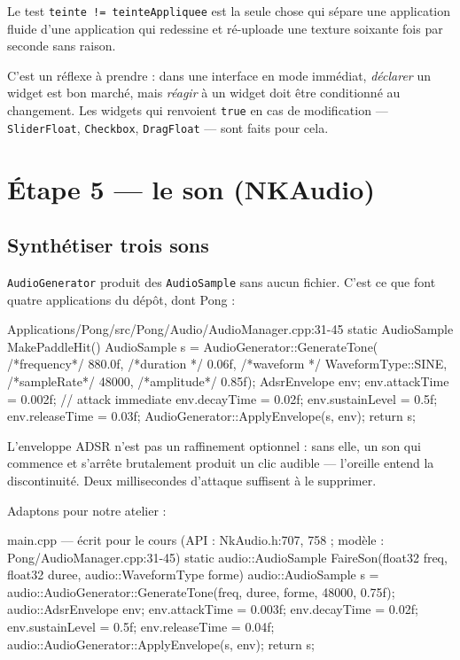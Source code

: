 \begin{nkretenir}
Le test \texttt{teinte != teinteAppliquee} est la seule chose qui sépare une
application fluide d'une application qui redessine et ré-uploade une texture
soixante fois par seconde sans raison.

C'est un réflexe à prendre : dans une interface en mode immédiat, \emph{déclarer}
un widget est bon marché, mais \emph{réagir} à un widget doit être conditionné au
changement. Les widgets qui renvoient \texttt{true} en cas de modification —
\texttt{SliderFloat}, \texttt{Checkbox}, \texttt{DragFloat} — sont faits pour
cela.
\end{nkretenir}

\section{Étape 5 — le son (NKAudio)}

\subsection{Synthétiser trois sons}

\texttt{AudioGenerator} produit des \texttt{AudioSample} sans aucun fichier.
C'est ce que font quatre applications du dépôt, dont Pong :

\begin{nkcode}{Applications/Pong/src/Pong/Audio/AudioManager.cpp:31-45}
        static AudioSample MakePaddleHit() {
            AudioSample s = AudioGenerator::GenerateTone(
                /*frequency*/ 880.0f,
                /*duration */ 0.06f,
                /*waveform */ WaveformType::SINE,
                /*sampleRate*/ 48000,
                /*amplitude*/ 0.85f);
            AdsrEnvelope env;
            env.attackTime = 0.002f; // attack immediate
            env.decayTime = 0.02f;
            env.sustainLevel = 0.5f;
            env.releaseTime = 0.03f;
            AudioGenerator::ApplyEnvelope(s, env);
            return s;
        }
\end{nkcode}

L'enveloppe ADSR n'est pas un raffinement optionnel : sans elle, un son qui
commence et s'arrête brutalement produit un clic audible — l'oreille entend la
discontinuité. Deux millisecondes d'attaque suffisent à le supprimer.

Adaptons pour notre atelier :

\begin{nkcode}{main.cpp — écrit pour le cours (API : NkAudio.h:707, 758 ; modèle : Pong/AudioManager.cpp:31-45)}
static audio::AudioSample FaireSon(float32 freq, float32 duree, audio::WaveformType forme) {
    audio::AudioSample s = audio::AudioGenerator::GenerateTone(freq, duree, forme, 48000, 0.75f);
    audio::AdsrEnvelope env;
    env.attackTime = 0.003f;
    env.decayTime = 0.02f;
    env.sustainLevel = 0.5f;
    env.releaseTime = 0.04f;
    audio::AudioGenerator::ApplyEnvelope(s, env);
    return s;
}
\end{nkcode}

